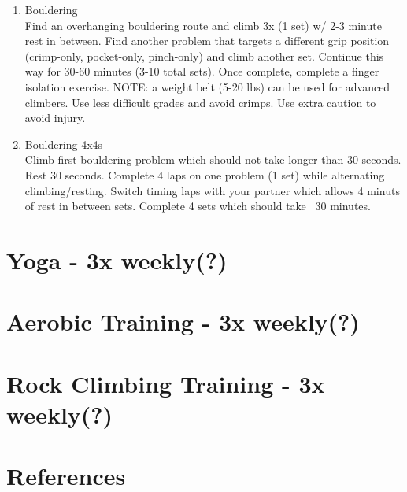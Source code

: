 \documentclass[12pt, letterpaper]{article}
\begin{document}
\begin{enumerate}
      
      \item Bouldering \\ 
            Find an overhanging bouldering route and climb 3x (1 set) w/ 2-3 minute rest
            in between. Find another problem that targets a different grip position
            (crimp-only, pocket-only, pinch-only) and climb another set. 
            Continue this way for 30-60 minutes (3-10 total sets).
            Once complete, complete a finger isolation exercise.
            NOTE: a weight belt (5-20 lbs) can be used for advanced climbers. 
            Use less difficult grades and avoid crimps. Use extra caution to avoid injury.
            
      \item Bouldering 4x4s \\ 
            Climb first bouldering problem which should not take longer than 
            30 seconds. Rest 30 seconds. Complete 4 laps on one problem (1 set)
            while alternating climbing/resting. Switch timing laps with your partner
            which allows 4 minuts of rest in between sets. Complete 4 sets which
            should take ~30 minutes.


\end{enumerate}

\newpage %


\section{Yoga - 3x weekly(?)}

\newpage %


\section{Aerobic Training - 3x weekly(?)}

\newpage %


\section{Rock Climbing Training - 3x weekly(?)}

\newpage %

\section{References}
\printbibliography[heading=none] 
\end{document}
